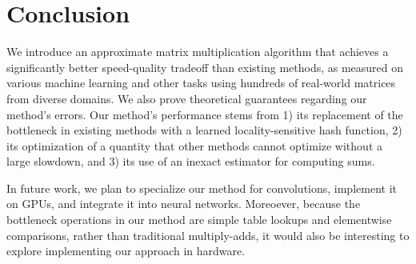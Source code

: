 \documentclass{article}  %
\begin{document}


\section{Conclusion}

We introduce an approximate matrix multiplication algorithm that achieves a significantly better speed-quality tradeoff than existing methods, as measured on various machine learning and other tasks using hundreds of real-world matrices from diverse domains. We also prove theoretical guarantees regarding our method's errors. Our method's performance stems from 1) its replacement of the bottleneck in existing methods with a learned locality-sensitive hash function, 2) its optimization of a quantity that other methods cannot optimize without a large slowdown, and 3) its use of an inexact estimator for computing sums.

In future work, we plan to specialize our method for convolutions, implement it on GPUs, and integrate it into neural networks. Moreoever, because the bottleneck operations in our method are simple table lookups and elementwise comparisons, rather than traditional multiply-adds, it would also be interesting to explore implementing our approach in hardware.





% 
% 
% 
% 

% 




\clearpage
\newpage  %
\appendix

\end{document}
